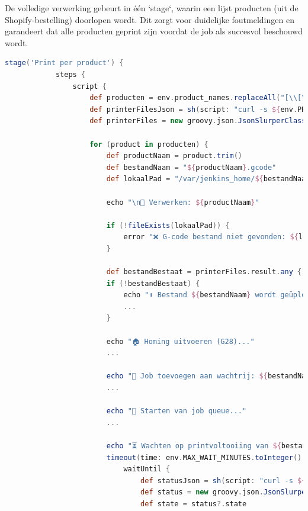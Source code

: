 \begin{enumerate}
\begin{itemize}
    De volledige verwerking gebeurt in één `stage`, waarin een lijst producten (uit de Shopify-bestelling) doorlopen wordt. Dit zorgt voor duidelijke foutmeldingen en garandeert dat alle producten geprint zijn voordat de job als succesvol beschouwd wordt.
    
    \begin{lstlisting}[language=groovy, caption=Sequentiële verwerking per product]
        stage('Print per product') {
            steps {
                script {
                    def producten = env.product_names.replaceAll("[\\[\\]\" ]", "").split(",")
                    def printerFilesJson = sh(script: "curl -s ${env.PRINTER_URL}/server/files/list?root=gcodes", returnStdout: true)
                    def printerFiles = new groovy.json.JsonSlurperClassic().parseText(printerFilesJson)
                    
                    for (product in producten) {
                        def productNaam = product.trim()
                        def bestandNaam = "${productNaam}.gcode"
                        def lokaalPad = "/var/jenkins_home/${bestandNaam}"
                        
                        echo "\n🔧 Verwerken: ${productNaam}"
                        
                        if (!fileExists(lokaalPad)) {
                            error "❌ G-code bestand niet gevonden: ${lokaalPad}"
                        }
                        
                        def bestandBestaat = printerFiles.result.any { it.path == bestandNaam }
                        if (!bestandBestaat) {
                            echo "⬆️ Bestand ${bestandNaam} wordt geüpload..."
                            ...
                        }
                        
                        echo "🏠 Homing uitvoeren (G28)..."
                        ...
                        
                        echo "📨 Job toevoegen aan wachtrij: ${bestandNaam}"
                        ...
                        
                        echo "🚦 Starten van job queue..."
                        ...
                        
                        echo "⏳ Wachten op printvoltooiing van ${bestandNaam}..."
                        timeout(time: env.MAX_WAIT_MINUTES.toInteger(), unit: 'MINUTES') {
                            waitUntil {
                                def statusJson = sh(script: "curl -s ${env.PRINTER_URL}/api/job", returnStdout: true).trim()
                                def status = new groovy.json.JsonSlurperClassic().parseText(statusJson)
                                def state = status?.state
                                

\end{lstlisting}
\end{itemize}
\end{enumerate}
